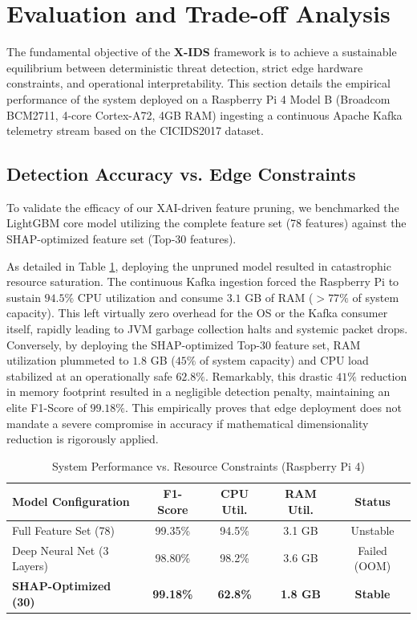 \section{Evaluation and Trade-off Analysis}
The fundamental objective of the \textbf{X-IDS} framework is to achieve a sustainable equilibrium between deterministic threat detection, strict edge hardware constraints, and operational interpretability. This section details the empirical performance of the system deployed on a Raspberry Pi 4 Model B (Broadcom BCM2711, 4-core Cortex-A72, 4GB RAM) ingesting a continuous Apache Kafka telemetry stream based on the CICIDS2017 dataset.

\subsection{Detection Accuracy vs. Edge Constraints}
To validate the efficacy of our XAI-driven feature pruning, we benchmarked the LightGBM core model utilizing the complete feature set (78 features) against the SHAP-optimized feature set (Top-30 features). 

As detailed in Table \ref{tab:benchmarks}, deploying the unpruned model resulted in catastrophic resource saturation. The continuous Kafka ingestion forced the Raspberry Pi to sustain $94.5\%$ CPU utilization and consume $3.1$ GB of RAM ($>77\%$ of system capacity). This left virtually zero overhead for the OS or the Kafka consumer itself, rapidly leading to JVM garbage collection halts and systemic packet drops. Conversely, by deploying the SHAP-optimized Top-30 feature set, RAM utilization plummeted to $1.8$ GB ($45\%$ of system capacity) and CPU load stabilized at an operationally safe $62.8\%$. Remarkably, this drastic $41\%$ reduction in memory footprint resulted in a negligible detection penalty, maintaining an elite F1-Score of $99.18\%$. This empirically proves that edge deployment does not mandate a severe compromise in accuracy if mathematical dimensionality reduction is rigorously applied.

\begin{table}[htbp]
\centering
\caption{System Performance vs. Resource Constraints (Raspberry Pi 4)}
\label{tab:benchmarks}
\begin{tabular*}{\columnwidth}{@{\extracolsep{\fill}}lcccc@{}}
\toprule
\textbf{Model Configuration} & \textbf{F1-Score} & \textbf{CPU Util.} & \textbf{RAM Util.} & \textbf{Status} \\
\midrule
Full Feature Set (78)      & 99.35\% & 94.5\% & 3.1 GB & Unstable \\
Deep Neural Net (3 Layers) & 98.80\% & 98.2\% & 3.6 GB & Failed (OOM) \\
\textbf{SHAP-Optimized (30)} & \textbf{99.18\%} & \textbf{62.8\%} & \textbf{1.8 GB} & \textbf{Stable} \\
\bottomrule
\end{tabular*}
\end{table}

